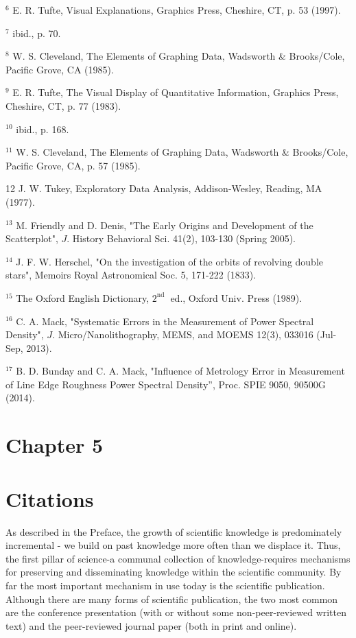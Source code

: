 ${ }^{6}$ E. R. Tufte, Visual Explanations, Graphics Press, Cheshire, CT, p. 53 (1997).

${ }^{7}$ ibid., p. 70.

${ }^{8}$ W. S. Cleveland, The Elements of Graphing Data, Wadsworth \& Brooks/Cole, Pacific Grove, CA (1985).

${ }^{9}$ E. R. Tufte, The Visual Display of Quantitative Information, Graphics Press, Cheshire, CT, p. 77 (1983).

${ }^{10}$ ibid., p. 168.

${ }^{11}$ W. S. Cleveland, The Elements of Graphing Data, Wadsworth \& Brooks/Cole, Pacific Grove, CA, p. 57 (1985).

12 J. W. Tukey, Exploratory Data Analysis, Addison-Wesley, Reading, MA (1977).

${ }^{13}$ M. Friendly and D. Denis, "The Early Origins and Development of the Scatterplot", $J$. History Behavioral Sci. 41(2), 103-130 (Spring 2005).

${ }^{14}$ J. F. W. Herschel, "On the investigation of the orbits of revolving double stars", Memoirs Royal Astronomical Soc. 5, 171-222 (1833).

${ }^{15}$ The Oxford English Dictionary, $2^{\text{nd }}$ ed., Oxford Univ. Press (1989).

${ }^{16}$ C. A. Mack, "Systematic Errors in the Measurement of Power Spectral Density", $J$. Micro/Nanolithography, MEMS, and MOEMS 12(3), 033016 (Jul-Sep, 2013).

${ }^{17}$ B. D. Bunday and C. A. Mack, "Influence of Metrology Error in Measurement of Line Edge Roughness Power Spectral Density”, Proc. SPIE 9050, 90500G (2014).

\section*{Chapter 5}
\section*{Citations}
As described in the Preface, the growth of scientific knowledge is predominately incremental - we build on past knowledge more often than we displace it. Thus, the first pillar of science-a communal collection of knowledge-requires mechanisms for preserving and disseminating knowledge within the scientific community. By far the most important mechanism in use today is the scientific publication. Although there are many forms of scientific publication, the two most common are the conference presentation (with or without some non-peer-reviewed written text) and the peer-reviewed journal paper (both in print and online).

